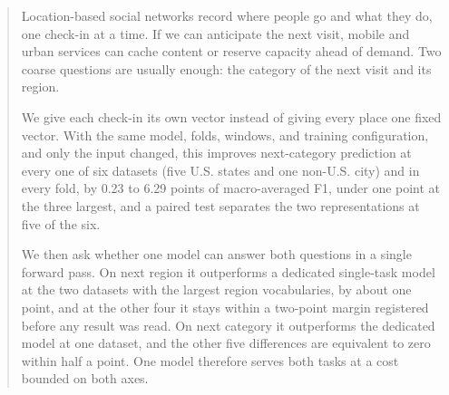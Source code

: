 \documentclass[conference]{IEEEtran}
\begin{document}
\maketitle
{}

\begin{abstract}
Location-based social networks record where people go and what they do, one check-in at a time.
If we can anticipate the next visit, mobile and urban services can cache content or reserve
capacity ahead of demand. Two coarse questions are usually enough: the category of the next visit
and its region.

We give each check-in its own vector instead of giving every place one fixed vector. With the same
model, folds, windows, and training configuration, and only the input changed, this improves next-category prediction at
every one of six datasets (five U.S. states and one non-U.S. city) and in every fold, by 0.23 to 6.29 points of macro-averaged F1, under
one point at the three largest, and a paired test separates the two representations at five of the
six.

We then ask whether one model can answer both questions in a single forward pass. On next region it outperforms a dedicated single-task model at the two datasets with the
largest region vocabularies, by about one point, and at the other four it stays within a two-point
margin registered before any result was read. On next category it
outperforms the dedicated model at one dataset, and the other five differences are equivalent to
zero within half a point. One model therefore serves both tasks at a cost bounded on both axes.
\end{abstract}
\end{document}
